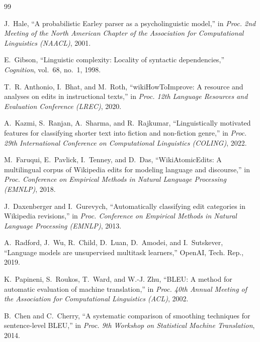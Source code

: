 \documentclass[12pt,a4paper,oneside]{report}
\begin{document}
\begin{thebibliography}{99}
\small

J.~Hale, ``A probabilistic Earley parser as a psycholinguistic model,'' in \emph{Proc. 2nd Meeting of the North American Chapter of the Association for Computational Linguistics (NAACL)}, 2001.

E.~Gibson, ``Linguistic complexity: Locality of syntactic dependencies,'' \emph{Cognition}, vol.~68, no.~1, 1998.

T.~R. Anthonio, I.~Bhat, and M.~Roth, ``wikiHowToImprove: A resource and analyses on edits in instructional texts,'' in \emph{Proc. 12th Language Resources and Evaluation Conference (LREC)}, 2020.

A.~Kazmi, S.~Ranjan, A.~Sharma, and R.~Rajkumar, ``Linguistically motivated features for classifying shorter text into fiction and non-fiction genre,'' in \emph{Proc. 29th International Conference on Computational Linguistics (COLING)}, 2022.

M.~Faruqui, E.~Pavlick, I.~Tenney, and D.~Das, ``WikiAtomicEdits: A multilingual corpus of Wikipedia edits for modeling language and discourse,'' in \emph{Proc. Conference on Empirical Methods in Natural Language Processing (EMNLP)}, 2018.

J.~Daxenberger and I.~Gurevych, ``Automatically classifying edit categories in Wikipedia revisions,'' in \emph{Proc. Conference on Empirical Methods in Natural Language Processing (EMNLP)}, 2013.

A.~Radford, J.~Wu, R.~Child, D.~Luan, D.~Amodei, and I.~Sutskever, ``Language models are unsupervised multitask learners,'' OpenAI, Tech. Rep., 2019.

K.~Papineni, S.~Roukos, T.~Ward, and W.-J. Zhu, ``BLEU: A method for automatic evaluation of machine translation,'' in \emph{Proc. 40th Annual Meeting of the Association for Computational Linguistics (ACL)}, 2002.

B.~Chen and C.~Cherry, ``A systematic comparison of smoothing techniques for sentence-level BLEU,'' in \emph{Proc. 9th Workshop on Statistical Machine Translation}, 2014.


\end{thebibliography}
\end{document}
